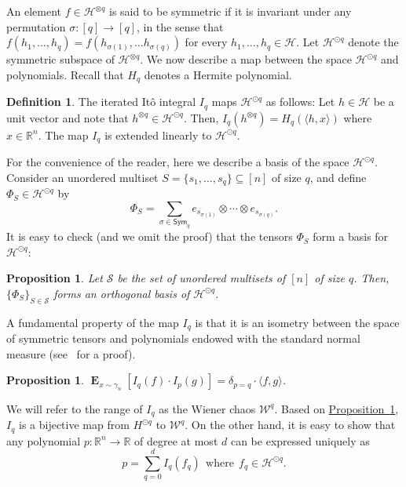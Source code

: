 \documentclass[11pt]{article}
\numberwithin{equation}{section}
\newtheorem{proposition}[theorem]{Proposition}
\theoremstyle{definition}
\newtheorem{definition}[theorem]{Definition}
\theoremstyle{plain}
\newcommand{\expref}[2]{\hyperref[#2]{#1~\ref{#2}}}
\begin{document}
An element $f  \in \mathcal{H}^{\otimes q}$ is said to be
symmetric if it is invariant under any permutation $\sigma: [q] \rightarrow
[q]$, in the sense that $f(h_1, \dots, h_q) = f(h_{\sigma(1)}, \dots
h_{\sigma(q)})$ for every $h_1, \dots, h_q \in \mathcal{H}$. Let
$\mathcal{H}^{\odot q}$ denote the symmetric subspace of
$\mathcal{H}^{\otimes q}$. 
%
%
%
%
We now describe a map
between the space $\mathcal{H}^{\odot q}$ and polynomials. Recall that $H_q$
denotes
a Hermite polynomial.
\begin{definition}
    The iterated It\^{o} integral $I_q$ maps $\mathcal{H}^{\odot q}$ as follows: Let $h \in \mathcal{H}$ be a unit vector and note that  $h^{\otimes q} \in \mathcal{H}^{\odot q}$. Then, 
$I_q(h^{\otimes q}) = H_q( \langle h , x \rangle)$ where $x \in \mathbb{R}^n$. The map $I_q$ is extended linearly to $\mathcal{H}^{\odot q}$. 
\end{definition}
For the convenience of the reader, here we describe a basis of the space $\mathcal{H}^{\odot q}$. Consider an unordered multiset $S = \{s_1, \ldots, s_q\} \subseteq [n]$ of size $q$, and define $\Phi_S \in \mathcal{H}^{\odot q}$ by
$$
\Phi_S = \sum_{\sigma \in \mathsf{Sym}_q} e_{s_{\sigma(1)}} \otimes \cdots \otimes e_{s_{\sigma(q)}}.
$$
It is easy to check (and we omit the proof) that the tensors $\Phi_S$ form a basis for $\mathcal{H}^{\odot q}$:
\begin{proposition}\label{prop:basis}
Let $\mathcal{S}$ be the set of unordered multisets of $[n]$ of size $q$. Then, $\{\Phi_S \}_{S \in \mathcal{S}}$ forms an orthogonal basis of $\mathcal{H}^{\odot q}$.
%
%
\end{proposition}
A fundamental property of the map $I_q$ is that it is an isometry between the space of symmetric tensors and polynomials endowed with the standard normal measure (see~\cite{Janson:97} for a proof). 
\begin{proposition}\label{prop:4}
$\mathop{\mathbf{E}}_{x \sim \gamma_n} [I_q(f) \cdot I_p(g)]  = \delta_{p=q} \cdot \langle f,  g \rangle$.
\end{proposition} 
We will  refer to the range of $I_q$ as the Wiener chaos $\mathcal{W}^{q}$. Based on \expref{Proposition}{prop:4}, $I_q$ is a bijective map from $H^{\odot q}$ to $\mathcal{W}^q$. 
On the other hand, it is easy to show that any polynomial $p: \mathbb{R}^n \rightarrow \mathbb{R}$ of degree at most $d$ can be expressed uniquely as 
\begin{equation}\label{eq:tensor-decomp}
p = \sum_{q=0}^d I_q(f_q) \ \ \textrm{where}  \ \ f_q \in \mathcal{H}^{\odot q}. 
\end{equation}
\end{document}
